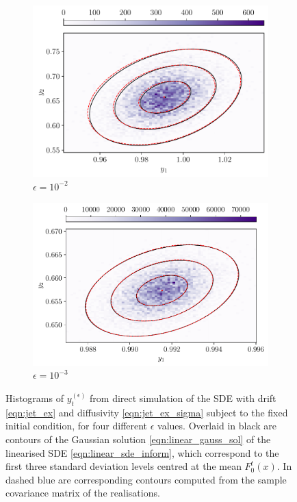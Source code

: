 \begin{figure}
\begin{center}
\begin{subfigure}{0.49\textwidth}
			\includegraphics[width=\textwidth]{chp04_paper_numerics/figures/rossby/hist_0.010000000000000002.pdf}
			\caption{\(\epsilon = 10^{-2}\)}
			\label{fig:y_hists_c}
		\end{subfigure}
		\begin{subfigure}{0.49\textwidth}
			\includegraphics[width=\textwidth]{chp04_paper_numerics/figures/rossby/hist_0.001.pdf}
			\caption{\(\epsilon = 10^{-3}\)}
			\label{fig:y_hists_d}
		\end{subfigure}
		\caption{Histograms of \(y_t^{(\epsilon)}\) from direct simulation of the SDE with drift \cref{eqn:jet_ex} and diffusivity \cref{eqn:jet_ex_sigma} subject to the fixed initial condition, for four different \(\epsilon\) values.
		Overlaid in black are contours of the Gaussian solution \cref{eqn:linear_gauss_sol} of the linearised SDE \cref{eqn:linear_sde_inform}, which correspond to the first three standard deviation levels centred at the mean \(F_0^t(x)\).
		In dashed blue are corresponding contours computed from the sample covariance matrix of the realisations.
		}
		\label{fig:y_hists}
	\end{center}
\end{figure}

